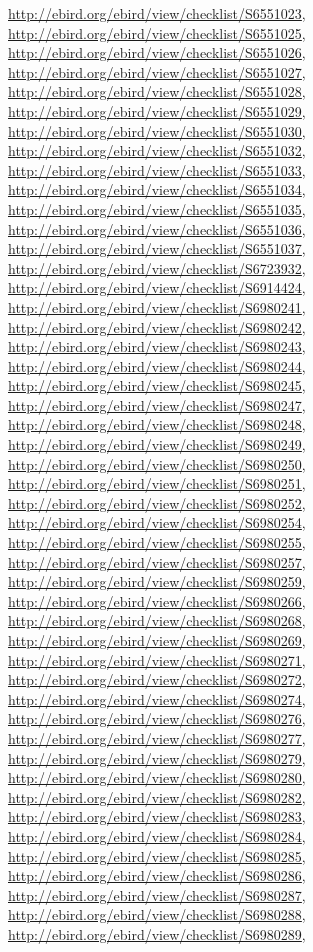 \documentclass[9pt, article]{memoir}
\begin{document}
\begin{multicols}{2}
\url{http://ebird.org/ebird/view/checklist/S6551023}, 
\url{http://ebird.org/ebird/view/checklist/S6551025}, 
\url{http://ebird.org/ebird/view/checklist/S6551026}, 
\url{http://ebird.org/ebird/view/checklist/S6551027}, 
\url{http://ebird.org/ebird/view/checklist/S6551028}, 
\url{http://ebird.org/ebird/view/checklist/S6551029}, 
\url{http://ebird.org/ebird/view/checklist/S6551030}, 
\url{http://ebird.org/ebird/view/checklist/S6551032}, 
\url{http://ebird.org/ebird/view/checklist/S6551033}, 
\url{http://ebird.org/ebird/view/checklist/S6551034}, 
\url{http://ebird.org/ebird/view/checklist/S6551035}, 
\url{http://ebird.org/ebird/view/checklist/S6551036}, 
\url{http://ebird.org/ebird/view/checklist/S6551037}, 
\url{http://ebird.org/ebird/view/checklist/S6723932}, 
\url{http://ebird.org/ebird/view/checklist/S6914424}, 
\url{http://ebird.org/ebird/view/checklist/S6980241}, 
\url{http://ebird.org/ebird/view/checklist/S6980242}, 
\url{http://ebird.org/ebird/view/checklist/S6980243}, 
\url{http://ebird.org/ebird/view/checklist/S6980244}, 
\url{http://ebird.org/ebird/view/checklist/S6980245}, 
\url{http://ebird.org/ebird/view/checklist/S6980247}, 
\url{http://ebird.org/ebird/view/checklist/S6980248}, 
\url{http://ebird.org/ebird/view/checklist/S6980249}, 
\url{http://ebird.org/ebird/view/checklist/S6980250}, 
\url{http://ebird.org/ebird/view/checklist/S6980251}, 
\url{http://ebird.org/ebird/view/checklist/S6980252}, 
\url{http://ebird.org/ebird/view/checklist/S6980254}, 
\url{http://ebird.org/ebird/view/checklist/S6980255}, 
\url{http://ebird.org/ebird/view/checklist/S6980257}, 
\url{http://ebird.org/ebird/view/checklist/S6980259}, 
\url{http://ebird.org/ebird/view/checklist/S6980266}, 
\url{http://ebird.org/ebird/view/checklist/S6980268}, 
\url{http://ebird.org/ebird/view/checklist/S6980269}, 
\url{http://ebird.org/ebird/view/checklist/S6980271}, 
\url{http://ebird.org/ebird/view/checklist/S6980272}, 
\url{http://ebird.org/ebird/view/checklist/S6980274}, 
\url{http://ebird.org/ebird/view/checklist/S6980276}, 
\url{http://ebird.org/ebird/view/checklist/S6980277}, 
\url{http://ebird.org/ebird/view/checklist/S6980279}, 
\url{http://ebird.org/ebird/view/checklist/S6980280}, 
\url{http://ebird.org/ebird/view/checklist/S6980282}, 
\url{http://ebird.org/ebird/view/checklist/S6980283}, 
\url{http://ebird.org/ebird/view/checklist/S6980284}, 
\url{http://ebird.org/ebird/view/checklist/S6980285}, 
\url{http://ebird.org/ebird/view/checklist/S6980286}, 
\url{http://ebird.org/ebird/view/checklist/S6980287}, 
\url{http://ebird.org/ebird/view/checklist/S6980288}, 
\url{http://ebird.org/ebird/view/checklist/S6980289}, 

\end{multicols}
\end{document}
